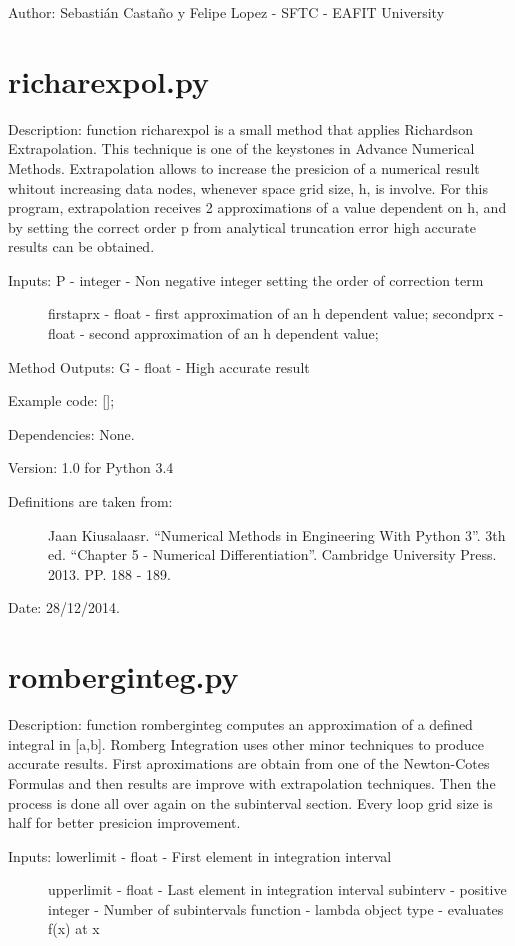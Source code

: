 \documentclass[letterpaper,10pt,oneside]{sphinxmanual}
\theoremstyle{plain}%
\theoremstyle{definition}%
\theoremstyle{remark}%
\begin{document}
Author: Sebastián Castaño y Felipe Lopez - SFTC - EAFIT University


\section{richarexpol.py}
\label{code:module-richarexpol}\label{code:richarexpol-py}
Description: function richarexpol is a small method that applies Richardson
Extrapolation. This technique is one of the keystones in Advance Numerical
Methods. Extrapolation allows to increase the presicion of a numerical 
result whitout increasing data nodes, whenever space grid size, h, is involve.
For this program, extrapolation receives 2 approximations of a value dependent
on h, and by setting the correct order p from analytical truncation error
high accurate results can be obtained.
\begin{description}
\item[{Inputs: P - integer - Non negative integer setting the order of correction term}] \leavevmode
firstaprx - float - first approximation of an h dependent value;
secondprx - float - second approximation of an h dependent value;

\end{description}

Method Outputs: G - float - High accurate result

Example code: {[}{]};

Dependencies: None.

Version: 1.0 for Python 3.4
\begin{description}
\item[{Definitions are taken from:}] \leavevmode
Jaan Kiusalaasr. ``Numerical Methods in Engineering With Python 3''.
3th ed. ``Chapter 5 - Numerical Differentiation''. 
Cambridge University Press. 2013. PP. 188 - 189.

\end{description}




Date: 28/12/2014.


\section{romberginteg.py}
\label{code:module-romberginteg}\label{code:romberginteg-py}
Description: function romberginteg computes an approximation of a defined
integral in {[}a,b{]}. Romberg Integration uses other minor techniques to produce
accurate results. First aproximations are obtain from one of the Newton-Cotes
Formulas and then results are improve with extrapolation techniques. Then
the process is done all over again on the subinterval section. Every loop
grid size is half for better presicion improvement.
\begin{description}
\item[{Inputs: lowerlimit - float - First element in integration interval}] \leavevmode
upperlimit - float - Last element in integration interval
subinterv - positive integer - Number of subintervals
function - lambda object type - evaluates f(x) at x

\end{description}
\end{document}
